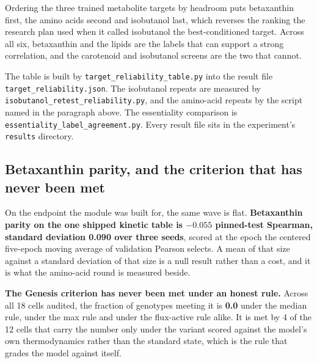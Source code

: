 Ordering the three trained metabolite targets by headroom puts betaxanthin first, the amino
acids second and isobutanol last, which reverses the ranking the research plan used when it
called isobutanol the best-conditioned target. Across all six, betaxanthin and the lipids
are the labels that can support a strong correlation, and the carotenoid and isobutanol
screens are the two that cannot.

The table is built by \texttt{target\_reliability\_table.py} into the result file
\texttt{target\_reliability.json}. The isobutanol repeats are measured by
\texttt{isobutanol\_retest\_reliability.py}, and the amino-acid repeats by the script named
in the paragraph above. The essentiality comparison is
\texttt{essentiality\_label\_agreement.py}. Every result file sits in the experiment's
\texttt{results} directory.

\subsection{Betaxanthin parity, and the criterion that has never been met}

On the endpoint the module was built for, the same wave is flat. \textbf{Betaxanthin parity
on the one shipped kinetic table is $-0.055$ pinned-test Spearman, standard deviation 0.090
over three seeds}, scored at the epoch the centered five-epoch moving average of validation
Pearson selects. A mean of that size against a standard deviation of that size is a null
result rather than a cost, and it is what the amino-acid round is measured beside.

\textbf{The Genesis criterion has never been met under an honest rule.} Across all 18 cells
audited, the fraction of genotypes meeting it is \textbf{0.0} under the median rule, under
the max rule and under the flux-active rule alike. It is met by 4 of the 12 cells that carry
the number only under the variant scored against the model's own thermodynamics rather than
the standard state, which is the rule that grades the model against itself.
